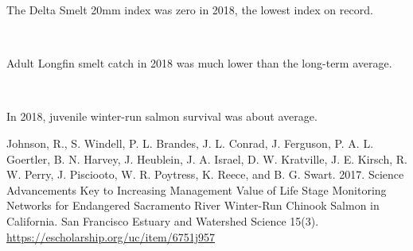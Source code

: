 \documentclass[
]{book}
\begin{document}
\begin{panel-grid}
\begin{columns-nocenter}
\begin{column800}
\begin{expand}
\end{expand}

\end{column800}

\end{columns-nocenter}

\begin{columns-nocenter}

\begin{column800}

The Delta Smelt 20mm index was zero in 2018, the lowest index on record.

\end{column800}

\begin{column40}

~

\end{column40}

\begin{column800}

Adult Longfin smelt catch in 2018 was much lower than the long-term average.

\end{column800}

\begin{column40}

~

\end{column40}

\begin{column800}

In 2018, juvenile winter-run salmon survival was about average.

\end{column800}

\end{columns-nocenter}

\end{panel-grid}

\begin{disclaimer}
Johnson, R., S. Windell, P. L. Brandes, J. L. Conrad, J. Ferguson, P. A.
L. Goertler, B. N. Harvey, J. Heublein, J. A. Israel, D. W. Kratville,
J. E. Kirsch, R. W. Perry, J. Pisciooto, W. R. Poytress, K. Reece, and
B. G. Swart. 2017. Science Advancements Key to Increasing Management
Value of Life Stage Monitoring Networks for Endangered Sacramento River
Winter-Run Chinook Salmon in California. San Francisco Estuary and
Watershed Science 15(3). \url{https://escholarship.org/uc/item/6751j957}
\end{disclaimer}
\end{document}
